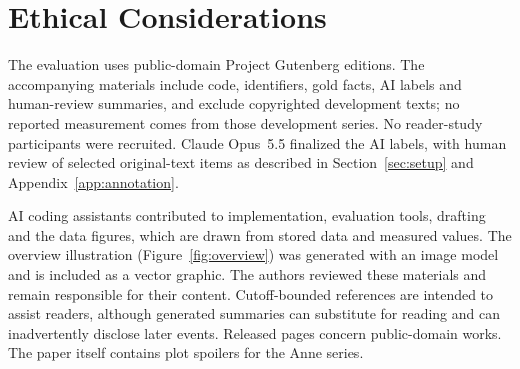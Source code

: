 \section*{Ethical Considerations}
\label{sec:ethics}

The evaluation uses public-domain Project Gutenberg editions. The accompanying materials include code,
identifiers, gold facts, AI labels and human-review summaries, and exclude copyrighted development texts; no reported
measurement comes from those development series. No reader-study participants were recruited.
Claude Opus~5.5 finalized the AI labels\ifnwhuman{}, with human review of selected original-text
items\fi{} as described in Section~\ref{sec:setup} and Appendix~\ref{app:annotation}.

AI coding assistants contributed to implementation, evaluation tools, drafting and the
data figures, which are drawn from stored data and measured values. The overview
illustration (Figure~\ref{fig:overview}) was generated with an image model and is included
as a vector graphic. The authors reviewed these materials and remain responsible
for their content. Cutoff-bounded references are intended to assist readers, although generated
summaries can substitute for reading and can inadvertently disclose later events. Released
pages concern public-domain works. The paper itself contains plot spoilers for the Anne series.
